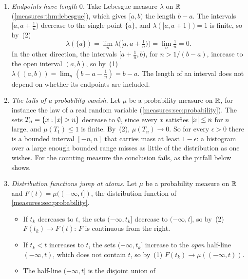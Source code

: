 \begin{notechapter}
\begin{example}
\label{measures:ex:continuity}
\leavevmode
\begin{enumerate}[nosep]
  \item \emph{Endpoints have length $0$.} Take Lebesgue measure
        $\lambda$ on $\mathbb{R}$ (\cref{measures:thm:lebesgue}), which gives
        $[a, b)$ the length $b - a$. The intervals $[a, a + \frac1n)$
        decrease to the single point $\{a\}$, and
        $\lambda([a, a + 1)) = 1$ is finite, so by~(2)
        \[
          \lambda(\{a\}) = \lim_n\lambda\bigl([a, a + \tfrac1n)\bigr)
          = \lim_n\tfrac1n = 0 .
        \]
        In the other direction, the intervals $[a + \frac1n, b)$, for
        $n > 1/(b - a)$, increase to the open interval $(a, b)$, so
        by~(1)
        $\lambda((a, b)) = \lim_n(b - a - \frac1n) = b - a$. The length
        of an interval does not depend on whether its endpoints are
        included.
  \item \emph{The tails of a probability vanish.} Let $\mu$ be a
        probability measure on $\mathbb{R}$, for instance the law of a real
        random variable (\cref{measures:sec:probability}). The sets
        $T_n = \{x : \left|x\right| > n\}$ decrease to $\emptyset$, since every
        $x$ satisfies $\left|x\right|\leq n$ for $n$ large, and $\mu(T_1)\leq1$
        is finite. By~(2), $\mu(T_n)\to0$. So for every $\epsilon > 0$
        there is a bounded interval $[-n, n]$ that carries mass at least
        $1 - \epsilon$: a histogram over a large enough bounded range
        misses as little of the distribution as one wishes. For the
        counting measure the conclusion fails, as the pitfall below
        shows.
  \item \emph{Distribution functions jump at atoms.} Let $\mu$ be a
        probability measure on $\mathbb{R}$ and $F(t) = \mu((-\infty, t])$, the
        distribution function of \cref{measures:sec:probability}.
        \begin{itemize}[nosep]
          \item If $t_k$ decreases to $t$, the sets $(-\infty, t_k]$
                decrease to $(-\infty, t]$, so by~(2)
                $F(t_k)\to F(t)$: $F$ is continuous from the right.
          \item If $t_k < t$ increases to $t$, the sets
                $(-\infty, t_k]$ increase to the \emph{open} half-line
                $(-\infty, t)$, which does not contain $t$, so by~(1)
                $F(t_k)\to\mu((-\infty, t))$.
          \item The half-line $(-\infty, t]$ is the disjoint union of

\end{itemize}
\end{enumerate}
\end{example}
\end{notechapter}
